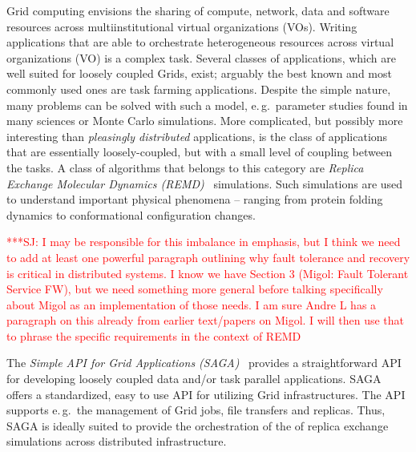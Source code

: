 \documentclass[times, 10pt,twocolumn]{article}
\newcommand{\jhanote}[1]{ {\textcolor{red} { ***SJ: #1 }}}
\begin{document}
                           
Grid computing envisions the sharing of compute, network, data and
software resources across multiinstitutional virtual organizations
(VOs). Writing applications that are able to orchestrate heterogeneous
resources across virtual organizations (VO) is a complex task.  Several 
classes of applications, which are well suited for loosely
coupled Grids, exist; arguably the best known and most commonly used ones are
task farming applications. Despite the simple nature, many problems
can be solved with such a model, e.\,g.\ parameter studies found in
many sciences or Monte Carlo simulations. More
complicated, but possibly more interesting than {\it pleasingly
  distributed} applications, is the class of applications that are
essentially loosely-coupled, but with a small level of coupling
between the tasks.   A class of algorithms that belongs to this category are
\emph{Replica Exchange Molecular Dynamics (REMD)}~\cite{hansmann,Sugita:1999rm} simulations.
Such simulations are used to understand important physical
phenomena -- ranging from protein folding dynamics to conformational
configuration changes.

\jhanote{I may be responsible for this imbalance in emphasis, but I
  think we need to add at least one powerful paragraph outlining why
  fault tolerance and recovery is critical in distributed systems. I
  know we have Section 3 (Migol: Fault Tolerant Service FW), but we
  need something more general before talking specifically about Migol
  as an implementation of those needs. I am sure Andre L has a
  paragraph on this already from earlier text/papers on Migol. I will
  then use that to phrase the specific requirements in the context of
  REMD}

The \emph{Simple API for Grid Applications (SAGA)}~\cite{saga_gfd90}
provides a straightforward API for developing loosely coupled data and/or task
parallel applications.
SAGA offers a standardized, easy to use API for utilizing Grid
infrastructures. The API supports e.\,g.\ the management of Grid jobs,
file transfers and replicas. Thus, SAGA is ideally suited to provide
the orchestration of the of replica exchange simulations across
distributed infrastructure.
                                                         
\end{document}
